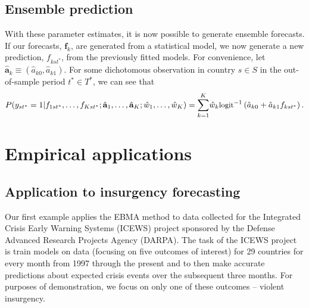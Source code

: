 \subsection{Ensemble prediction}

With these parameter estimates, it is now possible to generate
ensemble forecasts. If our forecasts, $\mathbf{f}_k$, are generated
from a statistical model, we now generate a new prediction,
$f_{kst^\ast}$, from the previously fitted models. For convenience,
let $\hat{\mathbf{a}}_k \equiv (\hat{a}_{k0}, \hat{a}_{k1})$. For some
dichotomous observation in country $s\in S$ in the out-of-sample
period $t^\ast\in T^\ast$, we can see that
\begin{equation}
\label{nothing}
{\small
P(y_{st^*} = 1 | f_{1st^\ast}, \ldots, f_{Kst^\ast} ;  \hat{\mathbf{a}}_1,
 \ldots, \hat{\mathbf{a}}_K ; \hat{w}_1, \ldots, \hat{w}_K) =
 \overset{K}{\underset{k=1}{\sum}} \hat{w}_k
 \mbox{logit}^{-1}\left(\hat{a}_{k0} +  \hat{a}_{k1}f_{kst^\ast}\right).}
\end{equation}


\section{Empirical applications}

\subsection{Application to insurgency forecasting}

Our first example applies the EBMA method to data
collected for the Integrated Crisis Early Warning Systems (ICEWS)
project sponsored by the Defense Advanced Research Projects Agency
(DARPA).  The task of the ICEWS project is train models on data
(focusing on five outcomes of interest) for 29 countries for every month from 1997
through the present and to then make accurate predictions about
expected crisis events over the subsequent three months.  For purposes of
demonstration, we focus on only one of these outcomes -- violent
insurgency.

